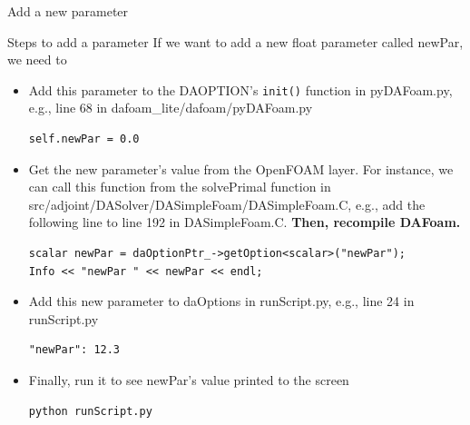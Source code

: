 \documentclass{bredelebeamer}
\begin{document}
\begin{frame}{}
  \center \Large Add a new parameter
\end{frame}


\begin{frame}[fragile]{Steps to add a parameter}
If we want to add a new float parameter called newPar, we need to
\begin{itemize}
  \setlength\itemsep{0.5em}
 \item Add this parameter to the DAOPTION's \texttt{init()} function in pyDAFoam.py, e.g., line 68 in dafoam\_lite/dafoam/pyDAFoam.py
 \footnotesize
 \lstset{ language=c++ }
 \begin{lstlisting}
self.newPar = 0.0
 \end{lstlisting}
 \normalsize
 \item Get the new parameter's value from the OpenFOAM layer. For instance, we can call this function from the solvePrimal function in src/adjoint/DASolver/DASimpleFoam/DASimpleFoam.C, e.g., add the following line to line 192 in DASimpleFoam.C. \textbf{Then, recompile DAFoam.}
 \footnotesize
 \lstset{ language=c++ }
 \begin{lstlisting}
scalar newPar = daOptionPtr_->getOption<scalar>("newPar");
Info << "newPar " << newPar << endl;
 \end{lstlisting}
 \normalsize
 \item Add this new parameter to daOptions in runScript.py, e.g., line 24 in runScript.py
 \footnotesize
 \lstset{ language=c++ }
 \begin{lstlisting}
"newPar": 12.3
 \end{lstlisting}
 \normalsize
 \item Finally, run it to see newPar's value printed to the screen
 \footnotesize
 \lstset{ language=c++ }
 \begin{lstlisting}
python runScript.py
 \end{lstlisting}
 \normalsize
\end{itemize}
\end{frame}
\end{document}
